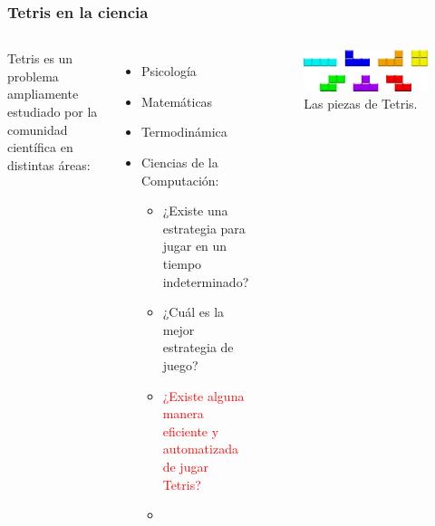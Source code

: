 \begin{frame}
\frametitle{Tetris en la ciencia}

\begin{columns}
Tetris es un problema ampliamente estudiado por la comunidad científica en distintas áreas: 

\begin{itemize}

\item Psicología
\item Matemáticas
\item Termodinámica
\item Ciencias de la Computación{}:
\begin{itemize}

\item ¿Existe una estrategia para jugar en un tiempo indeterminado? 
\item ¿Cuál es la mejor estrategia de juego?
\item \textcolor<3->{red}{¿Existe alguna manera eficiente y automatizada de jugar Tetris?}
\item[] 

\end{itemize}
{\onslide}
\end{itemize}

\begin{figure}
\includegraphics[scale=0.4]{./images/tetrominos.pdf}
\caption{Las piezas de Tetris.}
\end{figure}
\end{columns}


\end{frame}